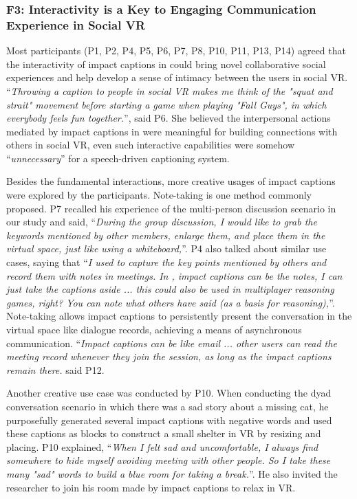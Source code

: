 

\subsubsection{F3: Interactivity is a Key to Engaging Communication Experience in Social VR}
\label{finding_interaction}
Most participants (P1, P2, P4, P5, P6, P7, P8, P10, P11, P13, P14) agreed that the interactivity of impact captions in \system{} could bring novel collaborative social experiences and help develop a sense of intimacy between the users in social VR. ``\textit{Throwing a caption to people in social VR makes me think of the "squat and strait" movement before starting a game when playing "Fall Guys", in which everybody feels fun together.}'', said P6. She believed the interpersonal actions mediated by impact captions in \system{} were meaningful for building connections with others in social VR, even such interactive capabilities were somehow ``\textit{unnecessary}'' for a speech-driven captioning system. 

Besides the fundamental interactions, more creative usages of impact captions were explored by the participants.
Note-taking is one method commonly proposed. P7 recalled his experience of the multi-person discussion scenario in our study and said, ``\textit{During the group discussion, I would like to grab the keywords mentioned by other members, enlarge them, and place them in the virtual space, just like using a whiteboard,}''. P4 also talked about similar use cases, saying that ``\textit{I used to capture the key points mentioned by others and record them with notes in meetings. In \system{}, impact captions can be the notes, I can just take the captions aside ... this could also be used in multiplayer reasoning games, right? You can note what others have said (as a basis for reasoning),}''.
Note-taking allows impact captions to persistently present the conversation in the virtual space like dialogue records, achieving a means of asynchronous communication. ``\textit{Impact captions can be like email ... other users can read the meeting record whenever they join the session, as long as the impact captions remain there.} said P12.

Another creative use case was conducted by P10. When conducting the dyad conversation scenario in which there was a sad story about a missing cat, he purposefully generated several impact captions with negative words and used these captions as blocks to construct a small shelter in VR by resizing and placing. P10 explained, ``\textit{When I felt sad and uncomfortable, I always find somewhere to hide myself avoiding meeting with other people. So I take these many "sad" words to build a blue room for taking a break.}''. He also invited the researcher to join his room made by impact captions to relax in VR.


